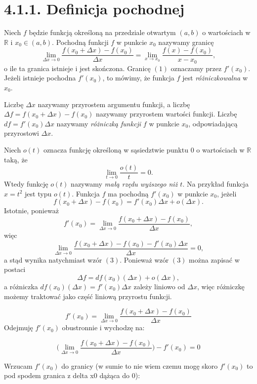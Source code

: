 \documentclass{article}
\begin{document}
\tableofcontents


\section{4.1.1. Definicja pochodnej}
Niech \( f \) będzie funkcją określoną na przedziale otwartym \((a, b)\) o wartościach w \(\mathbb{R}\) i \(x_0 \in (a, b)\). Pochodną funkcji \(f\) w punkcie \(x_0\) nazywamy granicę
\[
\lim_{\Delta x \to 0} \frac{f(x_0 + \Delta x) - f(x_0)}{\Delta x} = \lim_{x \to x_0} \frac{f(x) - f(x_0)}{x - x_0},
\]
o ile ta granica istnieje i jest skończona. Granicę \((1)\) oznaczamy przez \(f'(x_0)\). Jeżeli istnieje pochodna \(f'(x_0)\), to mówimy, że funkcja \(f\) jest \emph{różniczkowalna} w \(x_0\).

Liczbę \(\Delta x\) nazywamy przyrostem argumentu funkcji, a liczbę \(\Delta f = f(x_0 + \Delta x) - f(x_0)\) nazywamy przyrostem wartości funkcji. Liczbę \(df = f'(x_0)\Delta x\) nazywamy \emph{różniczką funkcji} \(f\) w punkcie \(x_0\), odpowiadającą przyrostowi \(\Delta x\).

Niech \(o(t)\) oznacza funkcję określoną w sąsiedztwie punktu \(0\) o wartościach w \(\mathbb{R}\) taką, że
\[
\lim_{t \to 0} \frac{o(t)}{t} = 0.
\]
Wtedy funkcję \(o(t)\) nazywamy \emph{małą rzędu wyższego niż \(t\)}. Na przykład funkcja \(x = t^2\) jest typu \(o(t)\). Funkcja \(f\) ma pochodną \(f'(x_0)\) w punkcie \(x_0\), jeżeli
\[
f(x_0 + \Delta x) - f(x_0) = f'(x_0)\Delta x + o(\Delta x).
\]
Istotnie, ponieważ
\[
f'(x_0) = \lim_{\Delta x \to 0} \frac{f(x_0 + \Delta x) - f(x_0)}{\Delta x},
\]
więc
\[
\lim_{\Delta x \to 0} \frac{f(x_0 + \Delta x) - f(x_0) - f'(x_0)\Delta x}{\Delta x} = 0,
\]
a stąd wynika natychmiast wzór \((3)\). Ponieważ wzór \((3)\) można zapisać w postaci
\[
\Delta f = df(x_0)(\Delta x) + o(\Delta x),
\]
a różniczka \(df(x_0)(\Delta x) = f'(x_0)\Delta x\) zależy liniowo od \(\Delta x\), więc różniczkę możemy traktować jako część liniową przyrostu funkcji.

\newpage
\begin{equation*}
    f'(x_0) = \lim_{\Delta x \to 0} \frac{f(x_0 + \Delta x) - f(x_0)}{\Delta x}
\end{equation*}
Odejmuję \(f'(x_0)\) obustronnie i wychodzę na:

\begin{equation*}
    \Bigg(\lim_{\Delta x \to 0} \frac{f(x_0 + \Delta x) - f(x_0)}{\Delta x}\Bigg) - f'(x_0) = 0
\end{equation*}

Wrzucam \(f'(x_0)\) do granicy (w sumie to nie wiem czemu mogę skoro \(f'(x_0)\) to pod spodem granica z delta x0 dążąca do 0):
\end{document}
